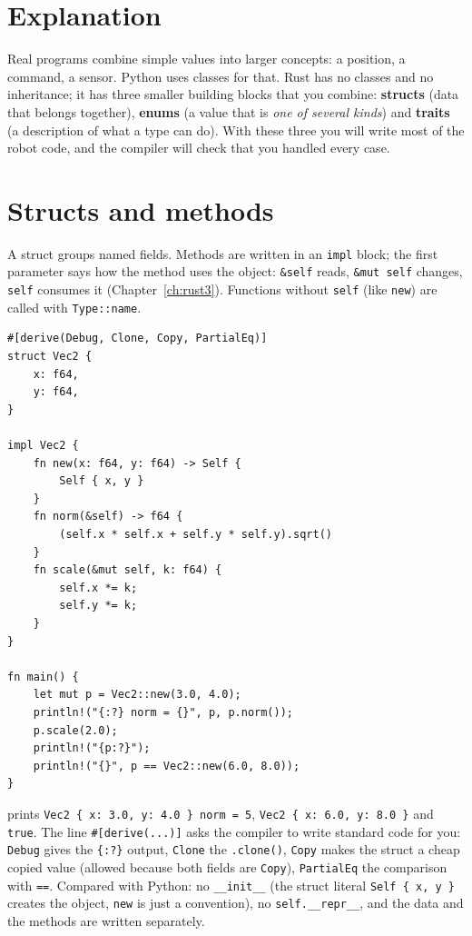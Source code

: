 \label{ch:rust4}

\section*{Explanation}
Real programs combine simple values into larger concepts: a position, a command, a sensor. Python uses classes for that. Rust has no classes and no inheritance; it has three smaller building blocks that you combine: \textbf{structs} (data that belongs together), \textbf{enums} (a value that is \emph{one of several kinds}) and \textbf{traits} (a description of what a type can do). With these three you will write most of the robot code, and the compiler will check that you handled every case.

\section*{Structs and methods}
A struct groups named fields. Methods are written in an \verb!impl! block; the first parameter says how the method uses the object: \verb!&self! reads, \verb!&mut self! changes, \verb!self! consumes it (Chapter~\ref{ch:rust3}). Functions without \verb!self! (like \verb!new!) are called with \verb!Type::name!.
\begin{verbatim}
#[derive(Debug, Clone, Copy, PartialEq)]
struct Vec2 {
    x: f64,
    y: f64,
}

impl Vec2 {
    fn new(x: f64, y: f64) -> Self {
        Self { x, y }
    }
    fn norm(&self) -> f64 {
        (self.x * self.x + self.y * self.y).sqrt()
    }
    fn scale(&mut self, k: f64) {
        self.x *= k;
        self.y *= k;
    }
}

fn main() {
    let mut p = Vec2::new(3.0, 4.0);
    println!("{:?} norm = {}", p, p.norm());
    p.scale(2.0);
    println!("{p:?}");
    println!("{}", p == Vec2::new(6.0, 8.0));
}
\end{verbatim}
prints \verb!Vec2 { x: 3.0, y: 4.0 } norm = 5!, \verb!Vec2 { x: 6.0, y: 8.0 }! and \verb!true!. The line \verb!#[derive(...)]! asks the compiler to write standard code for you: \verb!Debug! gives the \verb!{:?}! output, \verb!Clone! the \verb!.clone()!, \verb!Copy! makes the struct a cheap copied value (allowed because both fields are \verb!Copy!), \verb!PartialEq! the comparison with \verb!==!. Compared with Python: no \verb!__init__! (the struct literal \verb!Self { x, y }! creates the object, \verb!new! is just a convention), no \verb!self.__repr__!, and the data and the methods are written separately.

